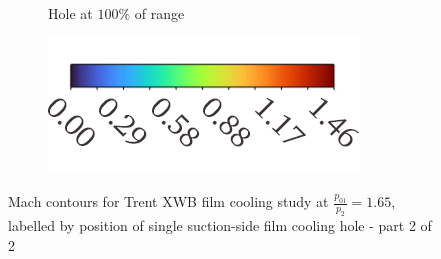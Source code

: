 \documentclass[a4paper, 11pt, oneside]{report}
\begin{document}
\begin{figure}[H]
\begin{subfigure}{.42\textwidth}
		\caption{Hole at $100\%$ of range}
	\end{subfigure}
	\hspace{0.071\textwidth}
	\begin{subfigure}{.4\textwidth}
		\centering
		\includegraphics[width=\linewidth]{figs/mach_legend_sch_horizontal.png}
	\end{subfigure}
	\caption{Mach contours for Trent XWB film cooling study at $\frac{p_{01}}{p_2}=1.65$, labelled by position of single suction-side film cooling hole - part 2 of 2}
	\label{fig:sch_mach_4-6}
\end{figure}
\end{document}
